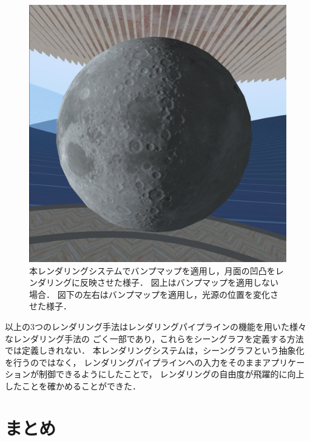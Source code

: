 \begin{figure}[htbp]
\begin{minipage}[t]{0.49\linewidth}
    \includegraphics[keepaspectratio, width=\linewidth]{figures/bump-map1.jpg}
  \end{minipage}
  \caption{
    本レンダリングシステムでバンプマップを適用し，月面の凹凸をレンダリングに反映させた様子．
    図上はバンプマップを適用しない場合．
    図下の左右はバンプマップを適用し，光源の位置を変化させた様子．
  }
  \label{fig:bumpmap}
\end{figure}

以上の3つのレンダリング手法はレンダリングパイプラインの機能を用いた様々なレンダリング手法の
ごく一部であり，これらをシーングラフを定義する方法では定義しきれない．
本レンダリングシステムは，シーングラフという抽象化を行うのではなく，
レンダリングパイプラインへの入力をそのままアプリケーションが制御できるようにしたことで，
レンダリングの自由度が飛躍的に向上したことを確かめることができた．



\section{まとめ}

